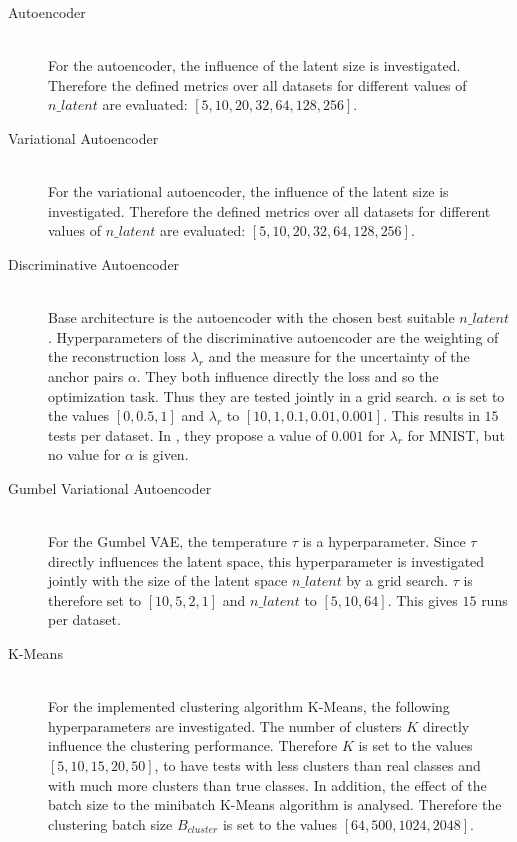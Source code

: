 \documentclass[12pt,DIV14,BCOR12mm,a4paper,footexclude,headinclude,halfparskip-,twoside,openright,cleardoubleempty,idxtotoc,bibtotoc,listtotoc,abstracton]{scrreprt} %
\numberwithin{equation}{chapter}
\begin{document}
\begin{description}
	\item[Autoencoder]\hfill \\
	For the autoencoder, the influence of the latent size is investigated. Therefore the defined metrics over all datasets for different values of $n\_latent$ are evaluated: $[5, 10, 20, 32, 64, 128, 256]$.
	\item[Variational Autoencoder]\hfill \\
	For the variational autoencoder, the influence of the latent size is investigated. Therefore the defined metrics over all datasets for different values of $n\_latent$ are evaluated: $[5, 10, 20, 32, 64, 128, 256]$.
	\item[Discriminative Autoencoder]\hfill \\
	Base architecture is the autoencoder with the chosen best suitable $n\_latent$. Hyperparameters of the discriminative autoencoder are the weighting of the reconstruction loss $\lambda_r$ and the measure for the uncertainty of the anchor pairs $\alpha$. They both influence directly the loss and so the optimization task. Thus they are tested jointly in a grid search. $\alpha$ is set to the values $[0, 0.5, 1]$ and $\lambda_r$ to $[10, 1, 0.1, 0.01, 0.001]$. This results in $15$ tests per dataset. In \cite{DiscriminativeClustering}, they propose a value of $0.001$ for $\lambda_r$ for MNIST, but no value for $\alpha$ is given.
	\item[Gumbel Variational Autoencoder]\hfill \\
	For the Gumbel VAE, the temperature $\tau$ is a hyperparameter. Since $\tau$ directly influences the latent space, this hyperparameter is investigated jointly with the size of the latent space $n\_latent$ by a grid search. $\tau$ is therefore set to $[10, 5, 2, 1]$ and $n\_latent$ to $[5, 10, 64]$. This gives $15$ runs per dataset.
	\item[K-Means]\hfill \\
	For the implemented clustering algorithm K-Means, the following hyperparameters are investigated. The number of clusters $K$ directly influence the clustering performance. Therefore $K$ is set to the values $[5, 10, 15, 20, 50]$, to have tests with less clusters than real classes and with much more clusters than true classes. In addition, the effect of the batch size to the minibatch K-Means algorithm is analysed. Therefore the clustering batch size $B_{cluster}$ is set to the values $[64, 500, 1024, 2048]$.
\end{description}
\end{document}
